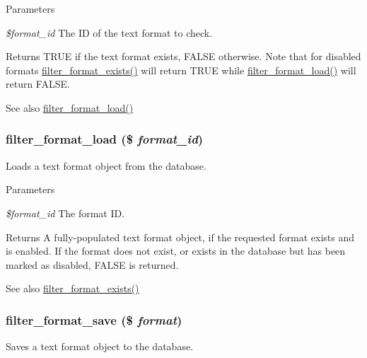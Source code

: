 \begin{DoxyParams}{Parameters}
\item[{\em \$format\_\-id}]The ID of the text format to check.\end{DoxyParams}
\begin{DoxyReturn}{Returns}
TRUE if the text format exists, FALSE otherwise. Note that for disabled formats \hyperlink{filter_8module_a2145846ce416161a821a055c9169a3a1}{filter\_\-format\_\-exists()} will return TRUE while \hyperlink{filter_8module_a8243109666d5f44bc7cc130743abaab3}{filter\_\-format\_\-load()} will return FALSE.
\end{DoxyReturn}
\begin{DoxySeeAlso}{See also}
\hyperlink{filter_8module_a8243109666d5f44bc7cc130743abaab3}{filter\_\-format\_\-load()} 
\end{DoxySeeAlso}
\hypertarget{filter_8module_a8243109666d5f44bc7cc130743abaab3}{
\subsubsection[{filter\_\-format\_\-load}]{\setlength{\rightskip}{0pt plus 5cm}filter\_\-format\_\-load (\$ {\em format\_\-id})}}
\label{filter_8module_a8243109666d5f44bc7cc130743abaab3}
Loads a text format object from the database.


\begin{DoxyParams}{Parameters}
\item[{\em \$format\_\-id}]The format ID.\end{DoxyParams}
\begin{DoxyReturn}{Returns}
A fully-\/populated text format object, if the requested format exists and is enabled. If the format does not exist, or exists in the database but has been marked as disabled, FALSE is returned.
\end{DoxyReturn}
\begin{DoxySeeAlso}{See also}
\hyperlink{filter_8module_a2145846ce416161a821a055c9169a3a1}{filter\_\-format\_\-exists()} 
\end{DoxySeeAlso}
\hypertarget{filter_8module_a3522ef59e8cc0abe0a448cb92b0d9212}{
\subsubsection[{filter\_\-format\_\-save}]{\setlength{\rightskip}{0pt plus 5cm}filter\_\-format\_\-save (\$ {\em format})}}
\label{filter_8module_a3522ef59e8cc0abe0a448cb92b0d9212}
Saves a text format object to the database.


